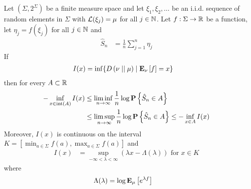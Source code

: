 \begin{thm}\label{CramersFiniteAlphabet}Let $(\Sigma,2^\Sigma)$ be a finite measure space and let $\xi_1, \xi_2, \dotsc$ be an i.i.d. sequence of random elements
in $\Sigma$ with $\mathcal{L}(\xi_j) = \mu$ for all $j \in \mathbb{N}$.  Let $f : \Sigma \to \mathbb{R}$ be a function, let $\eta_j = f(\xi_j)$ for all $j \in \mathbb{N}$ and
\begin{align*}
\hat{S}_n &= \frac{1}{n} \sum_{j=1}^n \eta_j
\end{align*}
If 
\begin{align*}
I(x) &= \inf \lbrace D\left( \nu \mid\mid \mu \right) \mid \textbf{E}_{\nu}\left [f \right]=x \rbrace
\end{align*}
then for every $A \subset \mathbb{R}$
\begin{align*}
-\inf_{x \in \operatorname*{int} \left( A \right)} I(x) 
&\leq \liminf_{n \to \infty} \frac{1}{n} \log \textbf{P}\left \{\hat{S}_n \in A \right \} \\
&\leq \limsup_{n \to \infty} \frac{1}{n} \log \textbf{P}\left \{\hat{S}_n \in A \right \} 
\leq -\inf_{x \in A} I(x)\\
\end{align*}
Moreover, $I(x)$ is continuous on the interval $K=[\min_{a \in \Sigma}f(a), \max_{a \in \Sigma} f(a)]$ and 
\begin{align*}
I(x) &= \sup_{-\infty < \lambda < \infty} (\lambda x - \Lambda(\lambda)) \text{ for $x \in K$}
\end{align*}
where 
\begin{align*}
\Lambda(\lambda) &= \log \textbf{E}_{\mu}\left [e^{\lambda f} \right]
\end{align*}
\end{thm}
